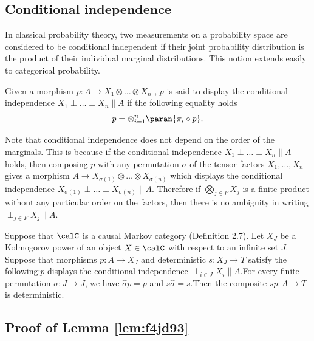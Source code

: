 \documentclass[12pt,oneside,pb-diagram]{article}
\begin{document}
\subsection{Conditional independence} 

In classical probability theory, two measurements on a probability space are considered to be conditional independent if their joint probability distribution is the product of their individual marginal distributions. This notion extends easily to categorical probability.

\begin{definition} 
	\cite[Def 2.10]{FritzRischel2020inf}
	Given a morphism $p : A \to X_1 \otimes \dots \otimes X_n$ , $p$ is said to display the conditional independence $X_1 \perp \dots \perp X_n \parallel A$ if the following equality holds
	\[ p = \otimes_{i=1}^{n} \paran{\pi_i \circ p} .\]
\end{definition}

Note that conditional independence does not depend on the order of the marginals. This is because if the conditional independence $X_1 \perp \dots \perp X_n \parallel A$ holds, then composing $p$ with any permutation $\sigma$ of the tensor factors $X_1, \dots, X_n$ gives a morphism $A \to X_{\sigma(1)} \otimes \dots \otimes X_{\sigma(n)}$ which displays the conditional independence $X_{\sigma(1)} \perp \dots \perp X_{\sigma(n)} \parallel A$. Therefore if $\bigotimes_{j \in F} X_j$ is a finite product without any particular order on the factors, then there is no ambiguity in writing $\perp_{j \in F} X_j \parallel A$.

\begin{lemma}  \label{lem:HewSav}
	\cite[Thm 5.4]{FritzRischel2020inf}
	Suppose that $\calC$ is a causal Markov category (Definition 2.7). Let $X_J$ be a Kolmogorov power of an object $X \in \calC$ with respect to an infinite set $J$. Suppose that morphisms $p : A \to X_J$ and deterministic $s : X_J \to T$ satisfy the following:$p$ displays the conditional independence $\perp_{i \in J} X_i \parallel A$.For every finite permutation $\sigma : J \to J$, we have $\hat{\sigma}p = p$ and $s\hat{\sigma} = s$.Then the composite $sp : A \to T$ is deterministic.
\end{lemma}

\subsection{Proof of Lemma \ref{lem:f4jd93}} \label{sec:proof:f4jd93}
\end{document}
